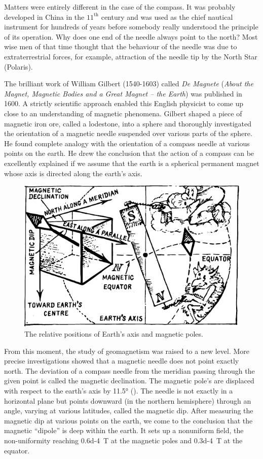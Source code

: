 Matters were entirely different in the case of the compass. It was probably developed in China in the $11^{\textrm{th}}$ century and was used as the chief nautical instrument for hundreds of years before somebody really understood the principle of its operation. Why does one end of the needle always point to the north? Most wise men of that time thought that the behaviour of the needle was due to extraterrestrial forces, for example, attraction of the needle tip by the North Star (Polaris).

The brilliant work of William Gilbert (1540-1603) called \emph{De Magnete} (\emph{About the Magnet, Magnetic Bodies and a Great Magnet -- the Earth}) was published in 1600. A strictly scientific approach enabled this English physicist to come up close to an understanding of magnetic phenomena. Gilbert shaped a piece of magnetic iron ore, called a lodestone, into a sphere and thoroughly investigated the orientation of a magnetic needle suspended over various parts of the sphere. He found complete analogy with the orientation of a compass needle at various points on the earth. He drew the conclusion that the action of a compass can be excellently explained if we assume that the earth is a spherical permanent magnet whose axis is directed along the earth's axis.

\begin{figure}[!ht]
\centering
\includegraphics[width=\textwidth]{figures/fig-03-10.pdf}
\caption{The relative positions of Earth's axis and magnetic poles.}
\label{fig-3.10}
\end{figure}


From this moment, the study of geomagnetism was raised to a new level. More precise investigations showed that a magnetic needle does not point exactly north. The deviation of a compass needle from the meridian passing through the given point is called the magnetic declination. The magnetic pole's are displaced with respect to the earth's axis by \ang{11.5} (). The needle is not exactly in a horizontal plane but points downward (in the northern hemisphere) through an angle, varying at various latitudes, called the magnetic dip. After measuring the magnetic dip at various points on the earth, we come to the conclusion that the magnetic ``dipole'' is deep within the earth. It sets up a nonuniform field, the non-uniformity reaching \SI{0.6d-4}{\tesla} at the magnetic poles and \SI{0.3d-4}{\tesla} at the equator.

